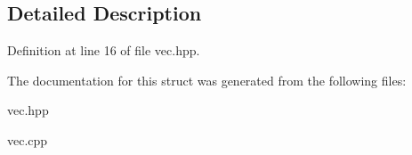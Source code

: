 \subsection{\-Detailed \-Description}


\-Definition at line 16 of file vec.\-hpp.



\-The documentation for this struct was generated from the following files\-:\begin{DoxyCompactItemize}
\item 
vec.\-hpp\item 
vec.\-cpp\end{DoxyCompactItemize}
